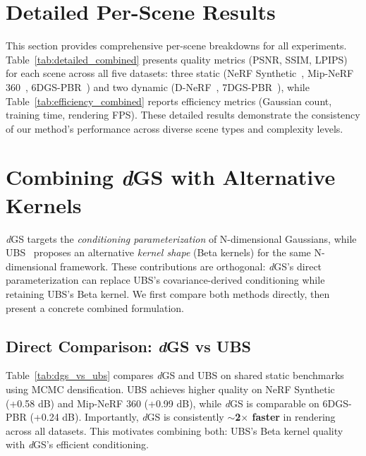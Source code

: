 \documentclass{article}
\newcommand{\modelname}{\textit{d}GS}
\theoremstyle{plain}
\theoremstyle{definition}
\theoremstyle{remark}
\begin{document}
\section{Detailed Per-Scene Results}
\label{sec:detailed_results}

This section provides comprehensive per-scene breakdowns for all experiments. Table~\ref{tab:detailed_combined} presents quality metrics (PSNR, SSIM, LPIPS) for each scene across all five datasets: three static (NeRF Synthetic~\cite{mildenhall2021nerf}, Mip-NeRF 360~\cite{barron2021mipnerf}, 6DGS-PBR~\cite{gao20246dgs}) and two dynamic (D-NeRF~\cite{pumarola2020dnerfneuralradiancefields}, 7DGS-PBR~\cite{gao20257dgs}), while Table~\ref{tab:efficiency_combined} reports efficiency metrics (Gaussian count, training time, rendering FPS). These detailed results demonstrate the consistency of our method's performance across diverse scene types and complexity levels.




\section{Combining \modelname{} with Alternative Kernels}
\label{sec:dbs}

\modelname{} targets the \textit{conditioning parameterization} of N-dimensional Gaussians, while UBS~\citep{liu2025universal} proposes an alternative \textit{kernel shape} (Beta kernels) for the same N-dimensional framework. These contributions are orthogonal: \modelname{}'s direct parameterization can replace UBS's covariance-derived conditioning while retaining UBS's Beta kernel. We first compare both methods directly, then present a concrete combined formulation.

\subsection{Direct Comparison: \modelname{} vs UBS}

Table~\ref{tab:dgs_vs_ubs} compares \modelname{} and UBS on shared static benchmarks using MCMC densification. UBS achieves higher quality on NeRF Synthetic (+0.58 dB) and Mip-NeRF 360 (+0.99 dB), while \modelname{} is comparable on 6DGS-PBR (+0.24 dB). Importantly, \modelname{} is consistently \textbf{$\sim$2$\times$ faster} in rendering across all datasets. This motivates combining both: UBS's Beta kernel quality with \modelname{}'s efficient conditioning.
\end{document}
